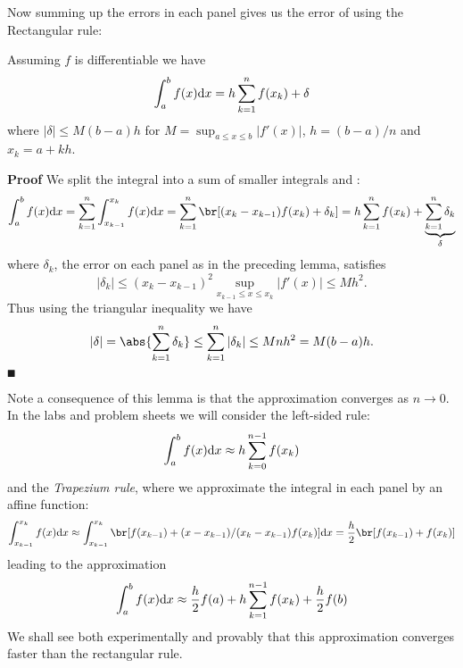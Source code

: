 Now summing up the errors in each panel gives us the error of using the Rectangular rule:

\begin{theorem} Assuming $f$ is differentiable we have
\[
\ensuremath{\int}_a^b f(x) {\rm d}x =  h \ensuremath{\sum}_{k=1}^n f(x_k) +  \ensuremath{\delta}
\]
where $|\ensuremath{\delta}| \ensuremath{\leq} M (b-a) h$ for $M = \sup_{a \ensuremath{\leq} x \ensuremath{\leq} b}|f'(x)|$, $h = (b-a)/n$ and $x_k = a + kh$. 

\end{theorem}
\textbf{Proof} We split the integral into a sum of smaller integrals and :
\[
\ensuremath{\int}_a^b f(x) {\rm d}x = \ensuremath{\sum}_{k=1}^n  \ensuremath{\int}_{x_{k-1}}^{x_k} f(x) {\rm d}x =
\ensuremath{\sum}_{k=1}^n  \br[(x_k - x_{k-1}) f(x_k) + \ensuremath{\delta}_k] =  h \ensuremath{\sum}_{k=1}^n f(x_k) +  \underbrace{\ensuremath{\sum}_{k=1}^n \ensuremath{\delta}_k}_\ensuremath{\delta}
\]
where $\ensuremath{\delta}_k$, the error on each panel as in the preceding lemma, satisfies 
\[
|\ensuremath{\delta}_k| \ensuremath{\leq} (x_k-x_{k-1})^2 \sup_{x_{k-1} \ensuremath{\leq} x \ensuremath{\leq} x_k}|f'(x)| \ensuremath{\leq} M h^2.
\]
Thus using the triangular inequality we have 
\[
|\ensuremath{\delta}| = \abs{ \ensuremath{\sum}_{k=1}^n \ensuremath{\delta}_k} \ensuremath{\leq} \ensuremath{\sum}_{k=1}^n |\ensuremath{\delta}_k| \ensuremath{\leq} M n h^2 = M(b-a)h.
\]
\ensuremath{\QED}

Note a consequence of this lemma is that the approximation converges as $n \ensuremath{\rightarrow} 0$. In the labs and problem sheets we will consider the left-sided rule:
\[
\ensuremath{\int}_a^b f(x) {\rm d}x \ensuremath{\approx}  h \ensuremath{\sum}_{k=0}^{n-1} f(x_k)
\]
and the \emph{Trapezium rule}, where we approximate the integral in each panel by an affine function:
\[
\ensuremath{\int}_{x_{k-1}}^{x_k} f(x) {\rm d} x \ensuremath{\approx} \ensuremath{\int}_{x_{k-1}}^{x_k} \br[f(x_{k-1}) + (x-x_{k-1})/(x_k - x_{k-1}) f(x_k)] {\rm d} x
= {h \over 2} \br[f(x_{k-1}) + f(x_k)]
\]
leading to the approximation
\[
\ensuremath{\int}_a^b f(x) {\rm d}x \ensuremath{\approx}  {h \over 2} f(a) + h \ensuremath{\sum}_{k=1}^{n-1} f(x_k) + {h \over 2} f(b)
\]
We shall see both experimentally and provably that this approximation converges faster than the rectangular rule.



